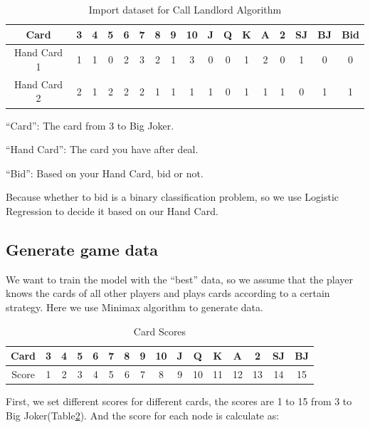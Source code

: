 \documentclass{article}
\begin{document}
\begin{table}[!ht]
    \caption{Import dataset for Call Landlord Algorithm}\label{Import}
    \centering
    \begin{threeparttable}          
      \begin{tabular}{ccccccccccccccccc}\toprule
        Card & 3 & 4 & 5 & 6 & 7 & 8 &9 &10 &J &Q &K &A &2 &SJ &BJ &Bid\\ \hline
        Hand Card 1 &1 &1 &0 &2 &3 &2 &1 &3 &0 &0 &1 &2 &0 &1 &0 &0 \\ \hline
        Hand Card 2 &2 &1 &2 &2 &2 &1 &1 &1 &1 &0 &1 &1 &1 &0 &1 &1\\ \bottomrule
      \end{tabular}
         \begin{tablenotes}    
        \footnotesize               
        \item[1] ``Card'': The card from 3 to Big Joker.         
        \item[2] ``Hand Card'': The card you have after deal.
        \item[3] ``Bid'': Based on your Hand Card, bid or not.
      \end{tablenotes}          
    \end{threeparttable}  
  \end{table}

Because whether to bid is a binary classification problem, so we use Logistic Regression to decide it based on our Hand Card.

\subsection{Generate game data}
We want to train the model with the ``best'' data, so we assume that the player knows the cards of all other players and plays cards according to a certain strategy. Here we use Minimax algorithm to generate data.

\begin{table}[!ht]
    \caption{Card Scores}\label{CardScore}
    \centering
    \begin{threeparttable}          
      \begin{tabular}{cccccccccccccccc}\toprule
        Card & 3 & 4 & 5 & 6 & 7 & 8 &9 &10 &J &Q &K &A &2 &SJ &BJ \\ \hline
        Score &1 &2 &3 &4 &5 &6 &7 &8 &9 &10 &11 &12 &13 &14 &15 \\ \bottomrule
      \end{tabular}
    \end{threeparttable}  
  \end{table}
First, we set different scores for different cards, the scores are 1 to 15 from 3 to Big Joker(Table\ref{CardScore}). And the score for each node is calculate as:
\end{document}
